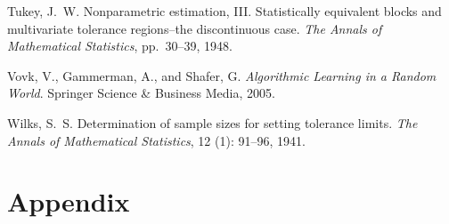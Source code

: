 \documentclass{article} %
\theoremstyle{remark}
\theoremstyle{definition}      %
\begin{document}
\begin{thebibliography}{29}
Tukey, J.~W.
\newblock Nonparametric estimation, {III}. {S}tatistically equivalent blocks
  and multivariate tolerance regions--the discontinuous case.
\newblock \emph{The Annals of Mathematical Statistics}, pp.\  30--39, 1948.

Vovk, V., Gammerman, A., and Shafer, G.
\newblock \emph{Algorithmic Learning in a Random World}.
\newblock Springer Science \& Business Media, 2005.

Wilks, S.~S.
\newblock Determination of sample sizes for setting tolerance limits.
\newblock \emph{The Annals of Mathematical Statistics}, 12
  (1): 91--96, 1941.

\end{thebibliography}



\appendix
\section*{Appendix}

\begin{table}[h]
    \centering
    \caption{Summary of depth-sketching (Deep sketch, VC), width-sketching (Width sketch), and the empirical quantile algorithm. The desired width of the empirical quantile algorithm is arbitrary but, for some $\bm{x}_* \in \mathbb{R}^d$, $\mathbb{E}_{u(\bm{x}_*)}\left[ W(\bm{x}_*,[C_{EQ}(\bm{x}_*, \delta)]) \right] = \Omega(\sqrt{n})$. The desired depth of the width-sketching algorithm is arbitrary, and $R(\delta)$ is arbitrarily small. The complexity of each is assumed to be polynomial in the data size $n$.}
    \label{tab:alg_summary}
\end{table}
\end{document}
